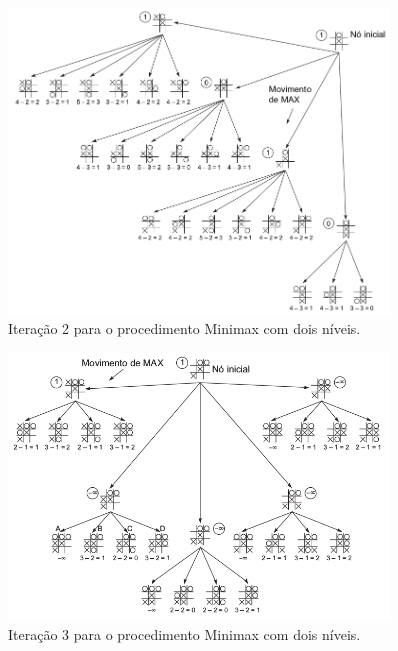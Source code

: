 \documentclass[12pt]{exam}
\begin{document}
\begin{questions}
\begin{figure}[h]
    \centering
    \includegraphics[width=0.90\textwidth]{tictacPoda02}
    \caption{Iteração 2 para o procedimento Minimax com dois níveis.}
    \label{fig:tictacPoda02}
\end{figure}

\begin{figure}[h]
    \centering
    \includegraphics[width=0.90\textwidth]{tictacPoda03}
    \caption{Iteração 3 para o procedimento Minimax com dois níveis.}
    \label{fig:tictacPoda03}
\end{figure}

\end{questions}
\end{document}
